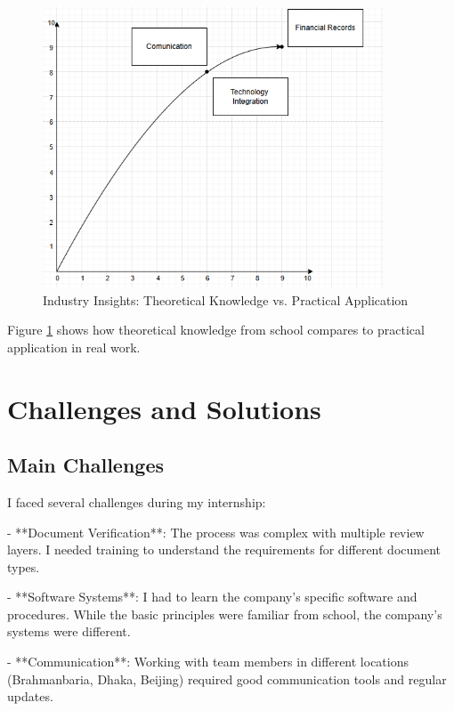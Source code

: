 \begin{figure}[H]
    \centering
    \includegraphics[width=0.9\textwidth]{assets/images/industry_insights_matrix.png}
    \caption{Industry Insights: Theoretical Knowledge vs. Practical Application}
    \label{fig:industry_insights_matrix}
\end{figure}

Figure \ref{fig:industry_insights_matrix} shows how theoretical knowledge from school compares to practical application in real work.

\vspace{0.5em}
\section{Challenges and Solutions}

\subsection{Main Challenges}
I faced several challenges during my internship:

- **Document Verification**: The process was complex with multiple review layers. I needed training to understand the requirements for different document types.

- **Software Systems**: I had to learn the company's specific software and procedures. While the basic principles were familiar from school, the company's systems were different.

- **Communication**: Working with team members in different locations (Brahmanbaria, Dhaka, Beijing) required good communication tools and regular updates.

